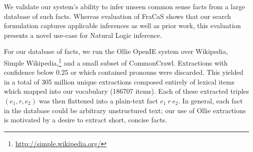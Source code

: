 %

%
%

\begin{table}
\begin{center}
  \caption{
    Accuracy inferring common-sense facts on a balanced test set.
    Lookup queries the lemmatized lower-case fact directly in the
      300M fact database.
    NaturalLI Only disallows such lookups, and infers every query from
      only unseen facts.
    NaturalLI + Lookup takes the union of the two systems.
    \label{tab:conceptnet}
  }
\end{center}
\end{table}

We validate our system's ability to infer unseen common sense facts
  from a large database of such facts.
Whereas evaluation of FraCaS shows that our search formulation captures
  applicable inferences as well as prior work, this evaluation presents
  a novel use-case for Natural Logic inference.

For our database of facts, we run the Ollie OpenIE system
  \cite{key:2012mausam-ollie} over Wikipedia, Simple Wikipedia,\footnote{
    \url{http://simple.wikipedia.org/}
  }
  and a small subset of CommonCrawl.
Extractions with confidence below 0.25 or which contained
  pronouns were discarded.
This yielded in a total of 305 million unique extractions composed
  entirely of lexical items which mapped into our vocabulary
  (\num{186707} items).
Each of these extracted triples $(e_1,r,e_2)$ was then flattened into
  a plain-text fact $e_1~r~e_2$.
In general, each fact in the database could be arbitrary unstructured
  text; our use of Ollie extractions is motivated by a desire to
  extract short, concise facts.

